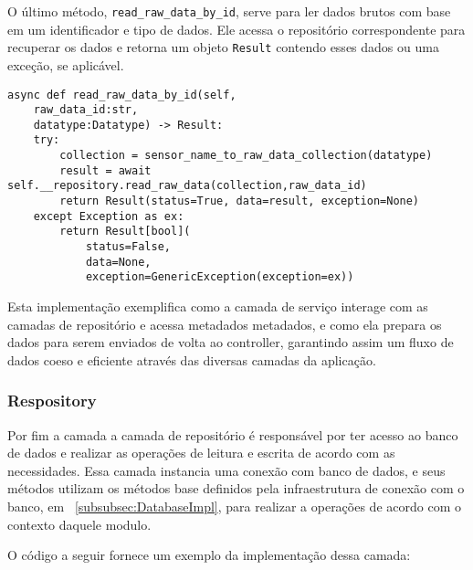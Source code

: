 O último método, \texttt{read\_raw\_data\_by\_id}, serve para ler dados brutos com base em um identificador e tipo de dados. Ele acessa o repositório correspondente para recuperar os dados e retorna um objeto \texttt{Result} contendo esses dados ou uma exceção, se aplicável.
\begin{verbatim}
async def read_raw_data_by_id(self,
    raw_data_id:str,
    datatype:Datatype) -> Result:
    try:
        collection = sensor_name_to_raw_data_collection(datatype)
        result = await self.__repository.read_raw_data(collection,raw_data_id)
        return Result(status=True, data=result, exception=None) 
    except Exception as ex:
        return Result[bool](
            status=False,
            data=None,
            exception=GenericException(exception=ex)) 

\end{verbatim}
Esta implementação exemplifica como a camada de serviço interage com as camadas de repositório e acessa metadados metadados, e como ela prepara os dados para serem enviados de volta ao controller, garantindo assim um fluxo de dados coeso e eficiente através das diversas camadas da aplicação.

\subsubsection{Respository}\label{subsubsec:repository}
Por fim a camada a camada de repositório é responsável por ter acesso ao banco de dados e realizar as operações de leitura e escrita de acordo com as necessidades. Essa camada instancia uma conexão com banco de dados, e seus métodos utilizam os métodos base definidos pela infraestrutura de conexão com o banco, em ~\ref{subsubsec:DatabaseImpl}, para realizar a operações de acordo com o contexto daquele modulo.

O código a seguir fornece um exemplo da implementação dessa camada:

